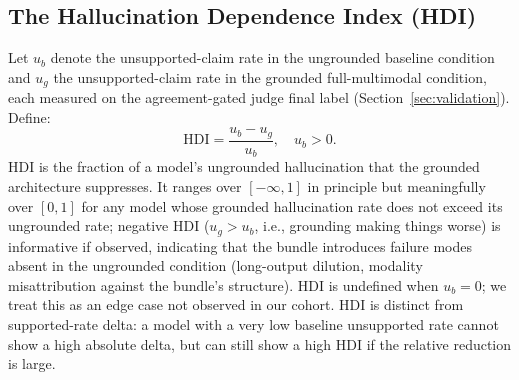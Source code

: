 \documentclass{article}
\theoremstyle{plain}
\begin{document}
\begin{table}[h]
\centering
\small
\setlength{\tabcolsep}{4pt}
\caption{Inter-rater agreement on a stratified 300-claim human adjudication sample ($N=300$, 60 claims per model-condition bucket). $\kappa$ is Cohen's kappa; CIs are 1000-resample bootstrap. Landis-Koch: $\kappa \geq 0.61$ = substantial.}
\label{tab:agreement}
\end{table}

\subsection{The Hallucination Dependence Index (HDI)}
Let $u_b$ denote the unsupported-claim rate in the ungrounded baseline condition and $u_g$ the unsupported-claim rate in the grounded full-multimodal condition, each measured on the agreement-gated judge final label (Section~\ref{sec:validation}). Define:
\begin{equation}
\text{HDI} = \frac{u_b - u_g}{u_b}, \quad u_b > 0.
\label{eq:hdi}
\end{equation}
HDI is the fraction of a model's ungrounded hallucination that the grounded architecture suppresses. It ranges over $[-\infty, 1]$ in principle but meaningfully over $[0, 1]$ for any model whose grounded hallucination rate does not exceed its ungrounded rate; negative HDI ($u_g > u_b$, i.e., grounding making things worse) is informative if observed, indicating that the bundle introduces failure modes absent in the ungrounded condition (long-output dilution, modality misattribution against the bundle's structure). HDI is undefined when $u_b = 0$; we treat this as an edge case not observed in our cohort. HDI is distinct from supported-rate delta: a model with a very low baseline unsupported rate cannot show a high absolute delta, but can still show a high HDI if the relative reduction is large.
\end{document}
